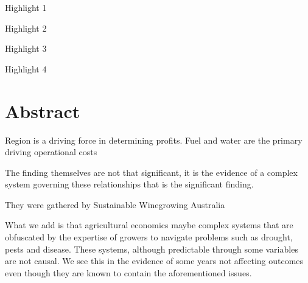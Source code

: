 \documentclass[review,12pt,authoryear]{elsarticle}
\begin{document}
\begin{linenumbers}
\begin{frontmatter}
\begin{highlights}
 \item Highlight 1
 \item Highlight 2
 \item Highlight 3
 \item Highlight 4
\end{highlights}
\end{frontmatter}


%







\section{Abstract}

Region is a driving force in determining profits.
Fuel and water are the primary driving operational costs

The finding themselves are not that significant, it is the evidence of a complex system governing these relationships that is the significant finding.

They were gathered by Sustainable Winegrowing Australia

What we add is that agricultural economics maybe complex systems that are obfuscated by the expertise of growers to navigate problems such as drought, pests and disease. These systems, although predictable through some variables are not causal. We see this in the evidence of some years not affecting outcomes even though they are known to contain the aforementioned issues.


\end{linenumbers}
\end{document}
